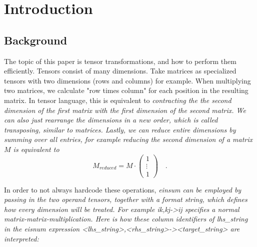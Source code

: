 \documentclass[sigconf]{acmart}
\renewcommand{\texttt}[1]{\begingroup\ttfamily\sloppy\hbadness=10000 #1\endgroup}
\begin{document}


\maketitle

\let\thefootnote\relax{}


\section{Introduction}
\subsection{Background}
The topic of this paper is tensor transformations, and how to perform them efficiently. Tensors consist of many dimensions. Take matrices as specialized tensors with two dimensions (rows and columns) for example. When multiplying two matrices, we calculate "row times column" for each position in the resulting matrix. In tensor language, this is equivalent to \em contracting \em the the second dimension of the first matrix with the first dimension of the second matrix. We can also just rearrange the dimensions in a new order, which is called  \em transposing\em , similar to matrices. Lastly, we can \em reduce \em entire dimensions by summing over all entries, for example reducing the second dimension of a matrix $M$ is equivalent to
\[ M_{reduced} = M \cdot \begin{pmatrix}
  1 \\
  \vdots \\
  1
\end{pmatrix} \quad . \]

\noindent
In order to not always hardcode these operations, \em einsum \em can be employed by passing in the two operand tensors, together with a format string, which defines how every dimension will be treated. For example \texttt{ik,kj->ij} specifies a normal matrix-matrix-multiplication. Here is how these \em column identifiers \em of \texttt{lhs\_string} in the eisnum expression \texttt{<lhs\_string>,<rhs\_string>-><target\_string>} are interpreted:
\end{document}
